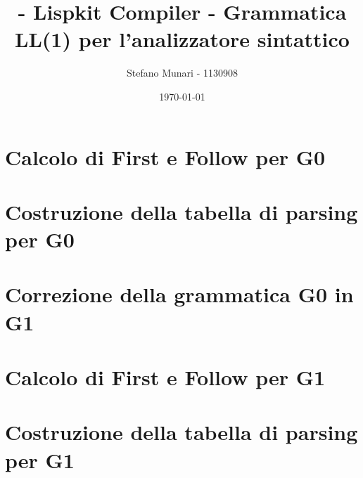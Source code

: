 \documentclass[12pt]{article}
\title{ - Lispkit Compiler - \linebreak
\textbf{Grammatica LL(1) per l'analizzatore sintattico}
}
\author{Stefano Munari - 1130908}
\date{\today}
\begin{document}
\maketitle
\newpage
\tableofcontents
\newpage

\section{Calcolo di First e Follow per G0}

\section{Costruzione della tabella di parsing per G0}

\section{Correzione della grammatica G0 in G1}

\section{Calcolo di First e Follow per G1}

\section{Costruzione della tabella di parsing per G1}

\end{document}
